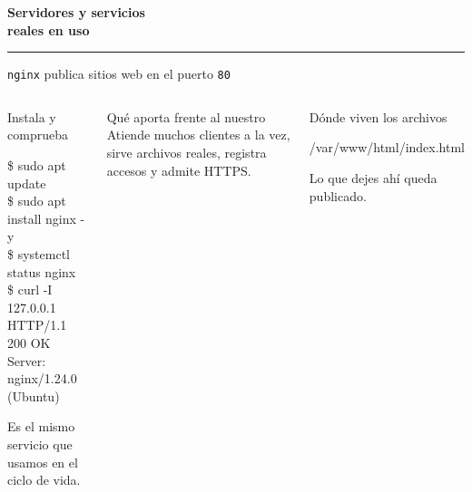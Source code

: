 \documentclass[aspectratio=169,10pt,c]{beamer}
\begin{document}
\begin{frame}[plain]
\vfill
\begin{center}
{\fontsize{29}{34}\selectfont\bfseries Servidores y servicios\\ reales en uso}\par
\vspace{4mm}
{\color{utpRojo}\rule{8.5cm}{1.2pt}}
\end{center}
\vfill
\end{frame}

\begin{frame}{\texttt{nginx} publica sitios web en el puerto \texttt{80}}
\begin{columns}[T,onlytextwidth]
\begin{exampleblock}{Instala y comprueba}
\begin{terminal}\footnotesize
\$ sudo apt update\\
\$ sudo apt install nginx -y\\
\$ systemctl status nginx\\
\$ curl -I 127.0.0.1\\
HTTP/1.1 200 OK\\
Server: nginx/1.24.0 (Ubuntu)
\end{terminal}
\small Es el mismo servicio que usamos en el ciclo de vida.
\end{exampleblock}
\begin{block}{Qué aporta frente al nuestro}
\small Atiende muchos clientes a la vez, sirve archivos reales, registra accesos y admite HTTPS.
\end{block}
\begin{exampleblock}{Dónde viven los archivos}
\begin{terminal}\footnotesize
/var/www/html/index.html
\end{terminal}
\small Lo que dejes ahí queda publicado.
\end{exampleblock}
\end{columns}
\end{frame}
\end{document}
